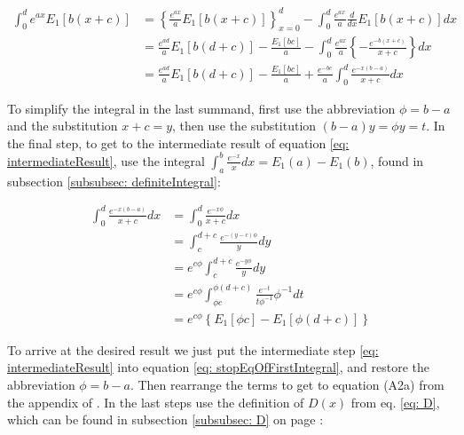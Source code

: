 \documentclass[bibliography=totocnumbered]{scrartcl}
\begin{document}
	\begin{align}
		\int_{0}^{d}e^{ax}E_1\left[b\left(x+c\right)\right]&=\left\{\frac{e^{ax}}{a}E_1\left[b\left(x+c\right)\right]\right\}_{x=0}^d-\int_{0}^{d}\frac{e^{ax}}{a}\frac{d}{dx}E_1\left[b\left(x+c\right)\right]dx\\
		&=\frac{e^{ad}}{a}E_1\left[b\left(d+c\right)\right]-\frac{E_1\left[bc\right]}{a}-\int_{0}^{d}\frac{e^{ax}}{a}\left\{-\frac{e^{-b\left(x+c\right)}}{x+c}\right\}dx\\
		&=\frac{e^{ad}}{a}E_1\left[b\left(d+c\right)\right]-\frac{E_1\left[bc\right]}{a}+\frac{e^{-bc}}{a}\int_{0}^{d}\frac{e^{-x\left(b-a\right)}}{x+c}dx\label{eq: stopEqOfFirstIntegral}
	\end{align}
	
	To simplify the integral in the last summand, first use the abbreviation $\phi=b-a$ and the substitution $x+c=y$, then use the substitution $\left(b-a\right)y=\phi{}y=t$. In the final step, to get to the intermediate result of equation \eqref{eq: intermediateResult}, use the integral $\int_{a}^{b}\frac{e^{-x}}{x}dx=E_1\left(a\right)-E_1\left(b\right)$, found in subsection  \ref{subsubsec: definiteIntegral}:
	
	\begin{align}
		\int_{0}^{d}\frac{e^{-x\left(b-a\right)}}{x+c}dx&=\int_{0}^{d}\frac{e^{-x\phi}}{x+c}dx\\
		&=\int_{c}^{d+c}\frac{e^{-\left(y-c\right)\phi}}{y}dy\\
		&=e^{c\phi}\int_{c}^{d+c}\frac{e^{-y\phi}}{y}dy\\
		&=e^{c\phi}\int_{\phi{}c}^{\phi\left(d+c\right)}\frac{e^{-t}}{t\phi^{-1}}\phi^{-1}dt\\
		&=e^{c\phi}\left\{E_1\left[\phi{}c\right]-E_1\left[\phi\left(d+c\right)\right]\right\}\label{eq: intermediateResult}
	\end{align}
	
	To arrive at the desired result we just put the intermediate step \eqref{eq: intermediateResult} into equation \eqref{eq: stopEqOfFirstIntegral}, and restore the abbreviation $\phi=b-a$. Then rearrange the terms to get to equation (A2a) from the appendix of \cite{boer1990calc}. In the last steps use the definition of $D\left(x\right)$ from eq. \eqref{eq: D}, which can be found in subsection \ref{subsubsec: D} on page \pageref{subsubsec: D}:
	
\end{document}
